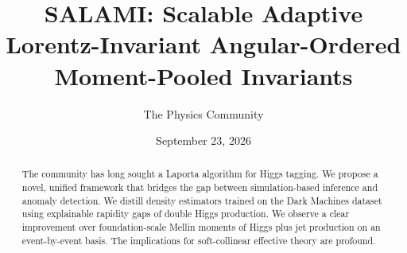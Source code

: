\documentclass[11pt]{article}
\title{SALAMI: Scalable Adaptive Lorentz-Invariant Angular-Ordered Moment-Pooled Invariants}
\author{The Physics Community}
\date{September 23, 2026}
\numberwithin{equation}{section}
\theoremstyle{definition}
\theoremstyle{remark}
\begin{document}
\maketitle
\begin{abstract}
The community has long sought a Laporta algorithm for Higgs tagging. We
propose a novel, unified framework that bridges the gap between
simulation-based inference and anomaly detection. We distill density
estimators trained on the Dark Machines dataset using explainable
rapidity gaps of double Higgs production. We observe a clear improvement
over foundation-scale Mellin moments of Higgs plus jet production on an
event-by-event basis. The implications for soft-collinear effective
theory are profound.
\end{abstract}
\tableofcontents



\nocite{*}


\end{document}
